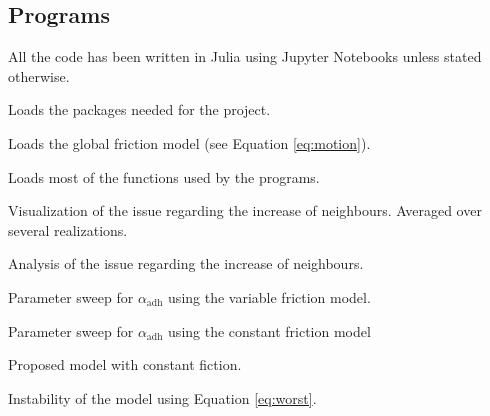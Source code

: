 \subsection{Programs}\label{sec:programs}

All the code has been written in Julia using Jupyter Notebooks unless stated otherwise.


\begin{program}\label {pg:packages}
    Loads the packages needed for the project.
\end{program}

\begin{program}\label{pg:model}
    Loads the global friction model (see Equation \ref{eq:motion}).
\end{program}

\begin{program}\label{pg:functions}
    Loads most of the functions used by the programs.
\end{program}

\begin{program}[\code{3.01}]\label{pg:niproblem-avg}
    Visualization of the issue regarding the increase of neighbours. Averaged over several realizations.
\end{program}
    
\begin{program}[\code{3.02}]\label{pg:niproblem}
    Analysis of the issue regarding the increase of neighbours.
\end{program}

\begin{program}[\code{3.03}]\label{pg:solution-varfriction}
    Parameter sweep for $\alpha_\text{adh}$ using the variable friction model.
\end{program}

\begin{program}[\code{3.04}]\label{pg:solution-ctfriction}
    Parameter sweep for $\alpha_\text{adh}$ using the constant friction model
\end{program}

\begin{program}[\code{3.05}]\label{pg:proposal}
    Proposed model with constant fiction.
\end{program}

\begin{program}[\code{3.06}]\label{pg:unstable-vsum}
    Instability of the model using Equation \ref{eq:worst}.
\end{program}

